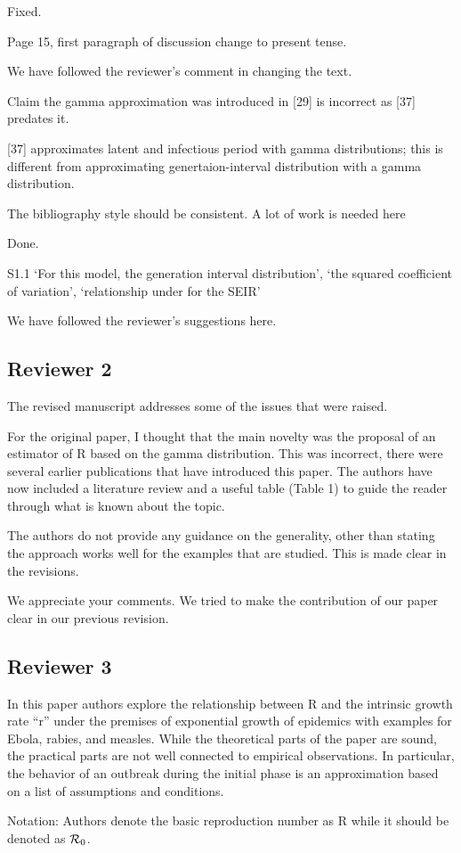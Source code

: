 \documentclass[12pt]{article}
\newcommand{\Rx}[1]{\ensuremath{{\cal R}_{#1}}}
\newcommand{\Ro}{\Rx{0}}
\newcommand{\rev}{\subsection*}
\newcommand{\revtext}{\textsf}
\begin{document}
Fixed.

\revtext{Page 15, first paragraph of discussion change to present tense.}

We have followed the reviewer's comment in changing the text.

\revtext{Claim the gamma approximation was introduced in [29] is incorrect as [37] predates it.}

[37] approximates latent and infectious period with gamma distributions; this is different from approximating genertaion-interval distribution with a gamma distribution.

\revtext{The bibliography style should be consistent. A lot of work is needed here}

Done.

\revtext{S1.1 ‘For this model, the generation interval distribution’, ‘the squared coefficient of variation’, ‘relationship under for the SEIR’}

We have followed the reviewer's suggestions here. 

\rev{Reviewer 2}

\revtext{The revised manuscript addresses some of the issues that were raised.}

\revtext{For the original paper, I thought that the main novelty was the
proposal of an estimator of R based on the gamma distribution. This
was incorrect, there were several earlier publications that have
introduced this paper. The authors have now included a literature
review and a useful table (Table 1) to guide the reader through what
is known about the topic.}

\revtext{The authors do not provide any guidance on the generality, other than
stating the approach works well for the examples that are studied.
This is made clear in the revisions.}

We appreciate your comments. We tried to make the contribution of our paper clear in our previous revision.

\rev{Reviewer 3}

\revtext{In this paper authors explore the relationship between R and the
intrinsic growth rate ``r'' under the premises of exponential growth of
epidemics with examples for Ebola, rabies, and measles. While the
theoretical parts of the paper are sound, the practical parts are not
well connected to empirical observations. In particular, the behavior
of an outbreak during the initial phase is an approximation based on a
list of assumptions and conditions.}

\revtext{Notation: Authors denote the basic reproduction number as R while it should be denoted as \Ro.}
\end{document}
